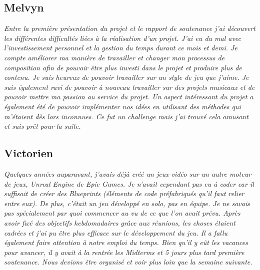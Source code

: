 \documentclass[12pt,a4paper]{article}
\begin{document}
    \subsection{Melvyn}
        \textit{Entre la première présentation du projet et le rapport de soutenance
        j'ai découvert les différentes difficultés liées à la réalisation d'un projet.
        J'ai eu du mal avec l'investissement personnel et la gestion du temps durant 
        ce mois et demi. Je compte améliorer ma manière de travailler et changer mon
        processus de composition afin de pouvoir être plus investi dans le projet et 
        produire plus de contenu. Je suis heureux de pouvoir travailler sur un style de 
        jeu que j'aime. Je suis également ravi de pouvoir à nouveau travailler sur des
        projets musicaux et de pouvoir mettre ma passion au service du projet.
        Un aspect intéressant du projet a également été de pouvoir implémenter nos idées
        en utilisant des méthodes qui m'étaient dès lors inconnues. Ce fut un challenge 
        mais j'ai trouvé cela amusant et suis prêt pour la suite.}
 
    \subsection{Victorien}
        \textit{Quelques années auparavant, j’avais déjà créé un jeux-vidéo 
        sur un autre moteur de jeux, \textsl{Unreal Engine} de \textsl{Epic Games}. 
        Je n’avait cependant pas eu à coder car il suffisait de créer des
        \textsl{Blueprints} (éléments de code préfabriqués qu’il faut relier 
        entre eux). De plus, c’était un jeu développé en solo, pas en équipe.
        Je ne savais pas spécialement par quoi commencer au vu de ce que l’on
        avait prévu. Après avoir fixé des objectifs hebdomadaires grâce aux 
        réunions, les choses étaient cadrées et j’ai pu être plus efficace sur
        le développement du jeu. Il a fallu également faire attention à notre 
        emploi du temps. Bien qu’il y eût les vacances pour avancer, il y avait 
        à la rentrée les Midterms et 5 jours plus tard première soutenance. 
        Nous devions être organisé et voir plus loin que la semaine suivante.}
  
\end{document}
